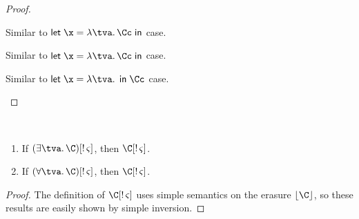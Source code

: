 \documentclass[acmsmall,screen,nonacm,review]{acmart}
\begin{document}
\begin{lemma}
\begin{proof}
\begin{proofcases}
      \proofcase{$\clet \x \tv \Cc \c$}

	\begin{llproof}
\Hand 	  {}
	\end{llproof}

      \proofcase{$\clet \x \tv \c \Cc$}

	\begin{llproof}
	  Similar to $\clet \x \tv \Cc \c$ case.
	\end{llproof}

      \proofcase{$\cletr \x \tv \tvs \Cc \c$}

	\begin{llproof}
	  Similar to $\clet \x \tv \Cc \c$ case.
	\end{llproof}

      \proofcase{$\cletr \x \tv \tvs \c \Cc$}

	\begin{llproof}
	  Similar to $\clet \x \tv \c \Cc$ case.
	\end{llproof}
    \end{proofcases}
  \end{proof}
\end{lemma}

\begin{lemma}
  \label{lem:unicity-inversion}~
  \begin{enumerate}[(\roman*)]
    \item If $\Cshape {\parens{\cexists \tv \C}} \t \sh$, then $\Cshape \C \t \sh$.
    \item If $\Cshape {\parens{\cfor \tv \C}} \t \sh$, then $\Cshape \C \t \sh$.
  \end{enumerate}
  \begin{proof}
    The definition of $\Cshape \C \t \sh$ uses simple semantics on the
    erasure $\cerase \C$, so these results are easily shown by simple inversion.
  \end{proof}
\end{lemma}
\end{document}
